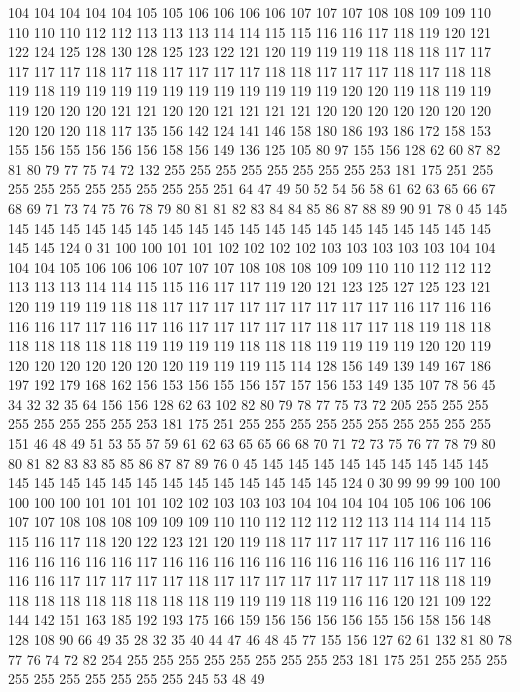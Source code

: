 104 104 104 104 104 105 105 106 106 106 106 107 107 107 108 108 109 109 110 110
110 110 112 112 113 113 113 114 114 115 115 116 116 117 118 119 120 121 122 124
125 128 130 128 125 123 122 121 120 119 119 119 118 118 118 117 117 117 117 117
118 117 118 117 117 117 117 118 118 117 117 117 118 117 118 118 119 118 119 119
119 119 119 119 119 119 119 119 119 120 120 119 118 119 119 119 120 120 120 121
121 120 120 121 121 121 121 120 120 120 120 120 120 120 120 120 120 118 117 135
156 142 124 141 146 158 180 186 193 186 172 158 153 155 156 155 156 156 156 158
156 149 136 125 105 80 97 155 156 128 62 60 87 82 81 80 79 77 75 74
72 132 255 255 255 255 255 255 255 255 253 181 175 251 255 255 255 255 255 255
255 255 255 251 64 47 49 50 52 54 56 58 61 62 63 65 66 67 68 69
71 73 74 75 76 78 79 80 81 81 82 83 84 84 85 86 87 88 89 90
91 78 0 45 145 145 145 145 145 145 145 145 145 145 145 145 145 145 145 145
145 145 145 145 145 145 124 0 31 100 100 101 101 102 102 102 102 103 103 103
103 103 104 104 104 104 105 106 106 106 107 107 107 108 108 108 109 109 110 110
112 112 112 113 113 113 114 114 115 115 116 117 117 119 120 121 123 125 127 125
123 121 120 119 119 119 118 118 117 117 117 117 117 117 117 117 117 116 117 116
116 116 116 117 117 116 117 116 117 117 117 117 117 118 117 117 118 119 118 118
118 118 118 118 118 119 119 119 119 118 118 118 119 119 119 119 120 120 119 120
120 120 120 120 120 120 119 119 119 115 114 128 156 149 139 149 167 186 197 192
179 168 162 156 153 156 155 156 157 157 156 153 149 135 107 78 56 45 34 32
32 35 64 156 156 128 62 63 102 82 80 79 78 77 75 73 72 205 255 255
255 255 255 255 255 255 253 181 175 251 255 255 255 255 255 255 255 255 255 255
151 46 48 49 51 53 55 57 59 61 62 63 65 65 66 68 70 71 72 73
75 76 77 78 79 80 80 81 82 83 83 85 85 86 87 87 89 76 0 45
145 145 145 145 145 145 145 145 145 145 145 145 145 145 145 145 145 145 145 145
145 145 124 0 30 99 99 99 100 100 100 100 100 101 101 101 102 102 103 103
103 104 104 104 104 105 106 106 106 107 107 108 108 108 109 109 109 110 110 112
112 112 112 113 114 114 114 115 115 116 117 118 120 122 123 121 120 119 118 117
117 117 117 117 116 116 116 116 116 116 116 116 117 116 116 116 116 116 116 116
116 116 116 116 117 116 116 116 117 117 117 117 117 118 117 117 117 117 117 117
117 117 118 118 119 118 118 118 118 118 118 118 118 119 119 119 118 119 116 116
120 121 109 122 144 142 151 163 185 192 193 175 166 159 156 156 156 156 155 156
158 156 148 128 108 90 66 49 35 28 32 35 40 44 47 46 48 45 77 155
156 127 62 61 132 81 80 78 77 76 74 72 82 254 255 255 255 255 255 255
255 255 253 181 175 251 255 255 255 255 255 255 255 255 255 255 245 53 48 49
